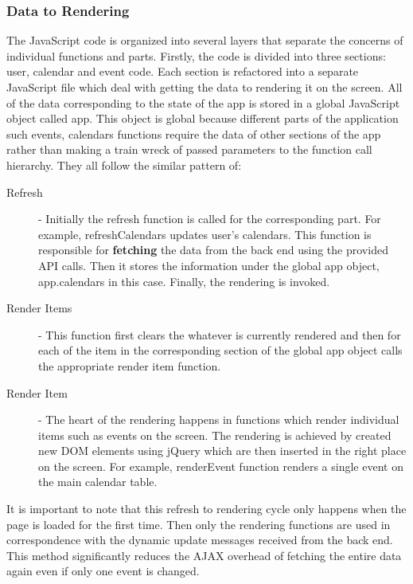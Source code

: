 \documentclass[10pt,a4paper]{article}
\begin{document}
\subsubsection{Data to Rendering}
The JavaScript code is organized into several layers that separate the concerns 
of individual functions and parts. Firstly, the code is divided into three sections: 
user, calendar and event code. Each section is refactored into a separate 
JavaScript file which deal with getting the data to rendering it on the screen. 
All of the data corresponding to the state of the app is stored in a global 
JavaScript object called app. This object is global because different parts of 
the application such events, calendars functions require the data of other 
sections of the app rather than making a train wreck of passed parameters to the 
function call hierarchy. They all follow the similar pattern of:
\begin{description}
\item[Refresh] - Initially the refresh function is called for the corresponding 
part. For example, refreshCalendars updates user's calendars. This function is 
responsible for \textbf{fetching} the data from the back end using the provided 
API calls. Then it stores the information under the global app object, 
app.calendars in this case. Finally, the rendering is invoked.
\item[Render Items] - This function first clears the whatever is currently 
rendered and then for each of the item in the corresponding section of the 
global app object calls the appropriate render item function.
\item[Render Item] - The heart of the rendering happens in functions which 
render individual items such as events on the screen. The rendering is achieved 
by created new DOM elements using jQuery which are then inserted in the right 
place on the screen. For example, renderEvent function renders a single event on 
the main calendar table.
\end{description}
It is important to note that this refresh to rendering cycle only happens when 
the page is loaded for the first time. Then only the rendering functions are 
used in correspondence with the dynamic update messages received from the 
back end. This method significantly reduces the AJAX overhead of fetching the 
entire data again even if only one event is changed.
\end{document}
